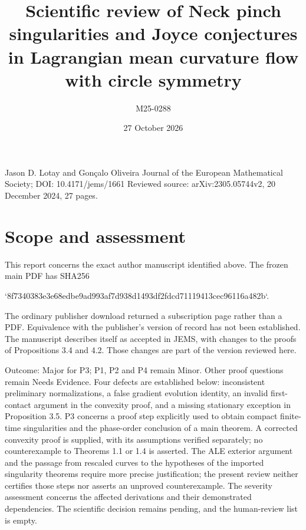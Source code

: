 \documentclass[10pt]{article}
\title{Scientific review of
Neck pinch singularities and Joyce conjectures in Lagrangian mean curvature flow with circle symmetry}
\author{M25-0288}
\date{27 October 2026}
\begin{document}
\maketitle
Jason D. Lotay and Gonçalo Oliveira
Journal of the European Mathematical Society; DOI: 10.4171/jems/1661
Reviewed source: arXiv:2305.05744v2, 20 December 2024, 27 pages.\par
\section*{Scope and assessment}
This report concerns the exact author manuscript identified above. The frozen main PDF has SHA256\par
`8f7340383e3e68edbe9ad993af7d938d1493df2fdcd71119413cec96116a482b`.\par
The ordinary publisher download returned a subscription page rather than a PDF. Equivalence with the publisher’s version of record has not been established. The manuscript describes itself as accepted in JEMS, with changes to the proofs of Propositions 3.4 and 4.2. Those changes are part of the version reviewed here.\par
Outcome: Major for P3; P1, P2 and P4 remain Minor. Other proof questions remain Needs Evidence. Four defects are established below: inconsistent preliminary normalizations, a false gradient evolution identity, an invalid first-contact argument in the convexity proof, and a missing stationary exception in Proposition 3.5. P3 concerns a proof step explicitly used to obtain compact finite-time singularities and the phase-order conclusion of a main theorem. A corrected convexity proof is supplied, with its assumptions verified separately; no counterexample to Theorems 1.1 or 1.4 is asserted. The ALE exterior argument and the passage from rescaled curves to the hypotheses of the imported singularity theorems require more precise justification; the present review neither certifies those steps nor asserts an unproved counterexample. The severity assessment concerns the affected derivations and their demonstrated dependencies. The scientific decision remains pending, and the human-review list is empty.\par
\end{document}
